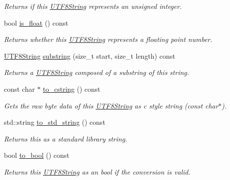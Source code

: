 \begin{DoxyCompactItemize}
\begin{DoxyCompactList}\small\item\em Returns if this \hyperlink{classchaos_1_1str_1_1_u_t_f8_string}{U\-T\-F8\-String} represents an unsigned integer. \end{DoxyCompactList}\item 
\hypertarget{classchaos_1_1str_1_1_u_t_f8_string_a2fbd69fb90a390df37c119577d4d3c6a}{bool \hyperlink{classchaos_1_1str_1_1_u_t_f8_string_a2fbd69fb90a390df37c119577d4d3c6a}{is\-\_\-float} () const }\label{classchaos_1_1str_1_1_u_t_f8_string_a2fbd69fb90a390df37c119577d4d3c6a}

\begin{DoxyCompactList}\small\item\em Returns whether this \hyperlink{classchaos_1_1str_1_1_u_t_f8_string}{U\-T\-F8\-String} represents a floating point number. \end{DoxyCompactList}\item 
\hyperlink{classchaos_1_1str_1_1_u_t_f8_string}{U\-T\-F8\-String} \hyperlink{classchaos_1_1str_1_1_u_t_f8_string_a2d50ab58715264ae175f521816bf670c}{substring} (size\-\_\-t start, size\-\_\-t length) const 
\begin{DoxyCompactList}\small\item\em Returns a \hyperlink{classchaos_1_1str_1_1_u_t_f8_string}{U\-T\-F8\-String} composed of a substring of this string. \end{DoxyCompactList}\item 
const char $\ast$ \hyperlink{classchaos_1_1str_1_1_u_t_f8_string_aa6fd66af34d7a3c4a495860952e97557}{to\-\_\-cstring} () const 
\begin{DoxyCompactList}\small\item\em Gets the raw byte data of this \hyperlink{classchaos_1_1str_1_1_u_t_f8_string}{U\-T\-F8\-String} as c style string (const char$\ast$). \end{DoxyCompactList}\item 
std\-::string \hyperlink{classchaos_1_1str_1_1_u_t_f8_string_a8901fbbe5e72d7bf8f0d160b55475244}{to\-\_\-std\-\_\-string} () const 
\begin{DoxyCompactList}\small\item\em Returns this as a standard library string. \end{DoxyCompactList}\item 
bool \hyperlink{classchaos_1_1str_1_1_u_t_f8_string_abea65bae8fc882d3bacb91aa2befe0b1}{to\-\_\-bool} () const 
\begin{DoxyCompactList}\small\item\em Returns this \hyperlink{classchaos_1_1str_1_1_u_t_f8_string}{U\-T\-F8\-String} as an bool if the conversion is valid. \end{DoxyCompactList}\item 

\end{DoxyCompactItemize}
